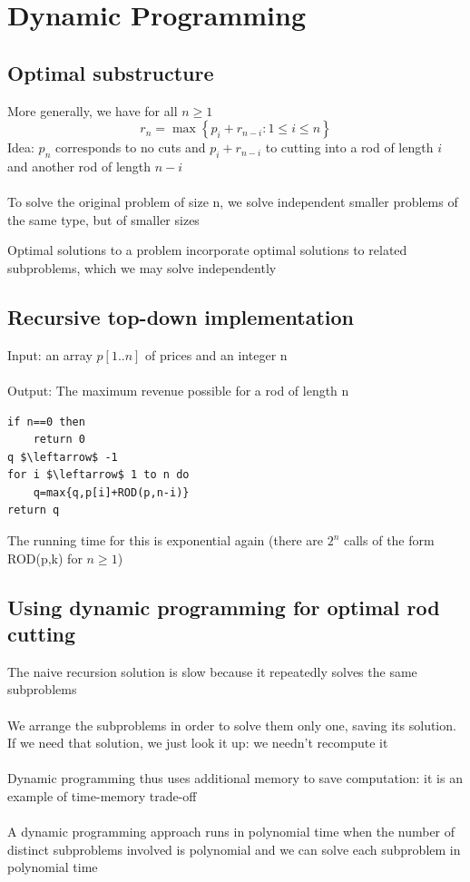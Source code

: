 \documentclass{article}[18pt]
\begin{document}
\section{Dynamic Programming}
\subsection{Optimal substructure}
More generally, we have for all $n\geqslant 1$
\[
r_{n}=\max \left\{p_{i}+r_{n-i}: 1 \leq i \leq n\right\}
\]
Idea: $p_n$ corresponds to no cuts and $p_i+r_{n-i}$ to cutting into a rod of length $i$ and another rod of length $n-i$\\
\\
To solve the original problem of size n, we solve independent smaller problems of the same type, but of smaller sizes
\begin{defin}
Optimal solutions to a problem incorporate optimal solutions to related subproblems, which we may solve independently	
\end{defin}
\subsection{Recursive top-down implementation}
Input: an array $p[1..n]$ of prices and an integer n\\
\\ 
Output: The maximum revenue possible for a rod of length n
\begin{lstlisting}[caption=ROD({p,n})]
if n==0 then
	return 0
q $\leftarrow$ -1
for i $\leftarrow$ 1 to n do
	q=max{q,p[i]+ROD(p,n-i)}
return q
\end{lstlisting}
The running time for this is exponential again (there are $2^n$ calls of the form ROD(p,k) for $n\geqslant 1$)
\subsection{Using dynamic programming for optimal rod cutting}
The naive recursion solution is slow because it repeatedly solves the same subproblems\\
\\
We arrange the subproblems in order to solve them only one, saving its solution. If we need that solution, we just look it up: we needn't recompute it\\
\\
Dynamic programming thus uses additional memory to save computation: it is an example of time-memory trade-off\\
\\
A dynamic programming approach runs in polynomial time when the number of distinct subproblems involved is polynomial and we can solve each subproblem in polynomial time
\end{document}
